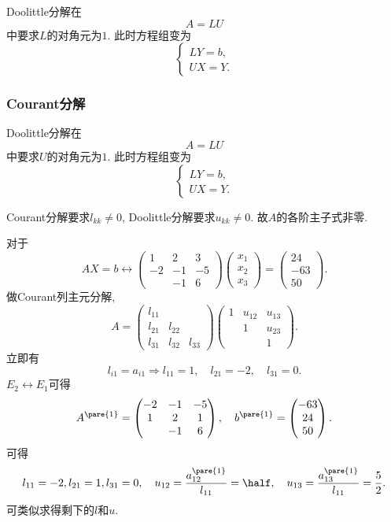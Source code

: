 \documentclass[hidelinks]{ctexart}
\begin{document}
Doolittle分解在
\[ A = LU \]
中要求$L$的对角元为$1$. 此时方程组变为
\[ \begin{cases}
    LY = b, \\
    UX = Y.
\end{cases} \]


\subsubsection{Courant分解} %
\label{ssub:courant分解}

Doolittle分解在
\[ A = LU \]
中要求$U$的对角元为$1$. 此时方程组变为
\[ \begin{cases}
    LY = b, \\
    UX = Y.
\end{cases} \]
\begin{remark}
    Courant分解要求$l_{kk} \neq 0$, Doolittle分解要求$u_{kk}\neq 0$. 故$A$的各阶主子式非零.
\end{remark}
\begin{ex}
    对于
    \[ AX=b \leftrightarrow \begin{pmatrix}
        1 & 2 & 3\\
        -2 & -1 & -5 \\
        & -1 & 6
    \end{pmatrix}\begin{pmatrix}
        x_1\\x_2\\x_3
    \end{pmatrix} = \begin{pmatrix}
        24 \\ -63 \\ 50
    \end{pmatrix}. \]
    做Courant列主元分解,
    \[ A = \begin{pmatrix}
        l_{11} & & \\
        l_{21} & l_{22} & \\
        l_{31} & l_{32} & l_{33}
    \end{pmatrix} \begin{pmatrix}
        1 & u_{12} & u_{13} \\
        & 1 & u_{23} \\
        & & 1
    \end{pmatrix}. \]
    立即有
    \[ l_{i1} = a_{i1} \Rightarrow l_{11} = 1,\quad l_{21} = -2,\quad l_{31} = 0. \]
    $E_2 \leftrightarrow E_1$可得
    \[ A^{\pare{1}} = \begin{pmatrix}
        -2 & -1 & -5 \\
        1 & 2 & 1\\
        & -1 & 6
    \end{pmatrix},\quad b^{\pare{1}} = \begin{pmatrix}
        -63 \\ 24 \\ 50
    \end{pmatrix}. \]
    可得
    \[ l_{11} = -2, l_{21} = 1, l_{31} = 0,\quad u_{12} = \frac{a_{12}^{\pare{1}}}{l_{11}} = \half,\quad u_{13} = \frac{a_{13}^{\pare{1}}}{l_{11}} = \frac{5}{2}. \]
    可类似求得剩下的$l$和$u$.
\end{ex}
\end{document}
